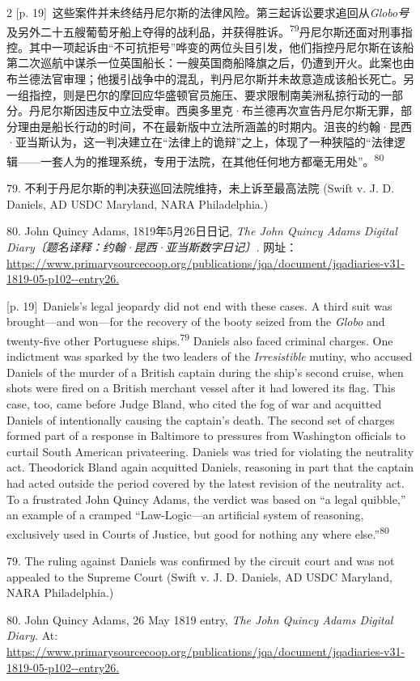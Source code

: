 \documentclass[10pt,a4paper]{article}
\begin{document}
\begin{paracol}{2}
{\scriptsize\color{gray} [p. 19]}\ 这些案件并未终结丹尼尔斯的法律风险。第三起诉讼要求追回从\textit{Globo号}及另外二十五艘葡萄牙船上夺得的战利品，并获得胜\mbox{诉。\textsuperscript{79}}丹尼尔斯还面对刑事指控。其中一项起诉由“不可抗拒号”哗变的两位头目引发，他们指控丹尼尔斯在该船第二次巡航中谋杀一位英国船长：一艘英国商船降旗之后，仍遭到开火。此案也由布兰德法官审理；他援引战争中的混乱，判丹尼尔斯并未故意造成该船长死亡。另一组指控，则是巴尔的摩回应华盛顿官员施压、要求限制南美洲私掠行动的一部分。丹尼尔斯因违反中立法受审。西奥多里克·布兰德再次宣告丹尼尔斯无罪，部分理由是船长行动的时间，不在最新版中立法所涵盖的时期内。沮丧的约翰·昆西·亚当斯认为，这一判决建立在“法律上的诡辩”之上，体现了一种狭隘的“法律逻辑——一套人为的推理系统，专用于法院，在其他任何地方都毫无用处”。\nobreak\textsuperscript{80}\par{\small 79. 不利于丹尼尔斯的判决获巡回法院维持，未上诉至最高法院 (Swift v. J. D. Daniels, AD USDC Maryland, NARA Philadelphia.)\par}{\small 80. John Quincy Adams, 1819年5月26日日记, \textit{The John Quincy Adams Digital Diary〔题名译释：约翰·昆西·亚当斯数字日记〕.} 网址： \url{https://www.primarysourcecoop.org/publications/jqa/document/jqadiaries-v31-1819-05-p102--entry26.}\par}
\switchcolumn
{\scriptsize\color{gray} [p. 19]}\ Daniels’s legal jeopardy did not end with these cases. A third suit was brought—and won—for the recovery of the booty seized from the \textit{Globo} and twenty-five other Portuguese ships.\nobreak\textsuperscript{79} Daniels also faced criminal charges. One indictment was sparked by the two leaders of the \textit{Irresistible} mutiny, who accused Daniels of the murder of a British captain during the ship’s second cruise, when shots were fired on a British merchant vessel after it had lowered its flag. This case, too, came before Judge Bland, who cited the fog of war and acquitted Daniels of intentionally causing the captain’s death. The second set of charges formed part of a response in Baltimore to pressures from Washington officials to curtail South American privateering. Daniels was tried for violating the neutrality act. Theodorick Bland again acquitted Daniels, reasoning in part that the captain had acted outside the period covered by the latest revision of the neutrality act. To a frustrated John Quincy Adams, the verdict was based on “a legal quibble,” an example of a cramped “Law-Logic—an artificial system of reasoning, exclusively used in Courts of Justice, but good for nothing any where else.”\nobreak\textsuperscript{80}\par{\small 79. The ruling against Daniels was confirmed by the circuit court and was not appealed to the Supreme Court (Swift v. J. D. Daniels, AD USDC Maryland, NARA Philadelphia.)\par}{\small 80. John Quincy Adams, 26 May 1819 entry, \textit{The John Quincy Adams Digital Diary.} At: \url{https://www.primarysourcecoop.org/publications/jqa/document/jqadiaries-v31-1819-05-p102--entry26.}\par}

\end{paracol}
\end{document}

